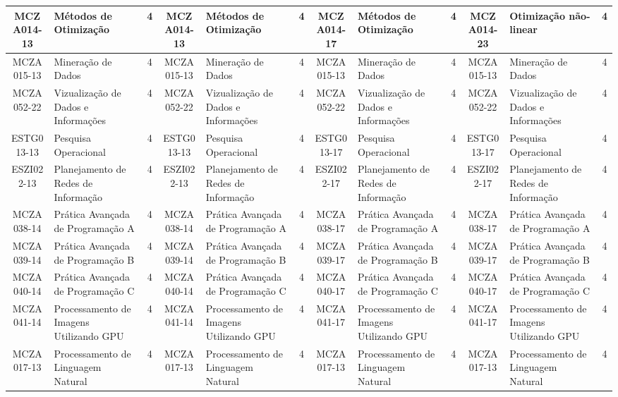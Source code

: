 \begin{landscape}
{\begin{longtable}{|c|p{.2\textheight}|c||c|p{.2\textheight}|c||c|p{.2\textheight}|c||c|p{.2\textheight}|c|}
MCZA014-13 & Métodos de Otimização & 4 &
MCZA014-13 & Métodos de Otimização & 4 &
MCZA014-17 & Métodos de Otimização & 4 &
MCZA014-23 & Otimização não-linear & 4\\ \hline

MCZA015-13 & Mineração de Dados & 4 &
MCZA015-13 & Mineração de Dados & 4 &
MCZA015-13 & Mineração de Dados & 4 &
MCZA015-13 & Mineração de Dados & 4\\ \hline

MCZA052-22 & Vizualização de Dados e Informações & 4 &
MCZA052-22 & Vizualização de Dados e Informações & 4 &
MCZA052-22 & Vizualização de Dados e Informações & 4 &
MCZA052-22 & Vizualização de Dados e Informações & 4\\ \hline

ESTG013-13 & Pesquisa Operacional & 4 &
ESTG013-13 & Pesquisa Operacional & 4 &
ESTG013-17 & Pesquisa Operacional & 4 &
ESTG013-17 & Pesquisa Operacional & 4\\ \hline

ESZI022-13 & Planejamento de Redes de Informação & 4 &
ESZI022-13 & Planejamento de Redes de Informação & 4 &
ESZI022-17 & Planejamento de Redes de Informação & 4 &
ESZI022-17 & Planejamento de Redes de Informação & 4\\ \hline

MCZA038-14 & Prática Avançada de Programação A & 4 &
MCZA038-14 & Prática Avançada de Programação A & 4 &
MCZA038-17 & Prática Avançada de Programação A & 4 &
MCZA038-17 & Prática Avançada de Programação A & 4\\ \hline

MCZA039-14 & Prática Avançada de Programação B & 4 &
MCZA039-14 & Prática Avançada de Programação B & 4 &
MCZA039-17 & Prática Avançada de Programação B & 4 & 
MCZA039-17 & Prática Avançada de Programação B & 4\\ \hline

MCZA040-14 & Prática Avançada de Programação C & 4 &
MCZA040-14 & Prática Avançada de Programação C & 4 &
MCZA040-17 & Prática Avançada de Programação C & 4 &
MCZA040-17 & Prática Avançada de Programação C & 4\\ \hline

MCZA041-14 & Processamento de Imagens Utilizando GPU & 4 &
MCZA041-14 & Processamento de Imagens Utilizando GPU & 4 &
MCZA041-17 & Processamento de Imagens Utilizando GPU & 4 & 
MCZA041-17 & Processamento de Imagens Utilizando GPU & 4\\ \hline

MCZA017-13 & Processamento de Linguagem Natural & 4 &
MCZA017-13 & Processamento de Linguagem Natural & 4 &
MCZA017-13 & Processamento de Linguagem Natural & 4 &
MCZA017-13 & Processamento de Linguagem Natural & 4\\ \hline


\end{longtable}}
\end{landscape}
